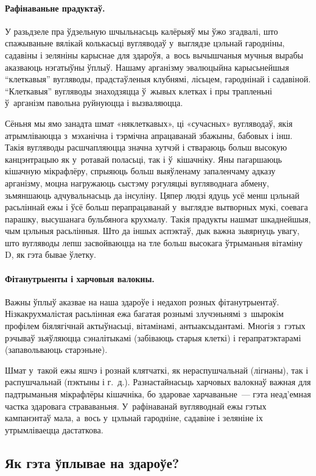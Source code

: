 \paragraph{Рафінаваньне прадуктаў.}
У разьдзеле пра ўдзельную шчыльнасьць калёрыяў мы ўжо згадвалі, што спажываньне вялікай колькасьці вугляводаў у~выглядзе цэльнай гародніны, садавіны і зеляніны карыснае для здароўя, а~вось вычышчаныя мучныя вырабы аказваюць нэгатыўны ўплыў. Нашаму арганізму эвалюцыйна карысьнейшыя ``клеткавыя'' вугляводы, прадстаўленыя клубнямі, лісьцем, гароднінай і садавіной. ``Клеткавыя'' вугляводы знаходзяцца ў~жывых клетках і пры трапленьні ў~арганізм павольна руйнуюцца і вызваляюцца.

Сёньня мы ямо занадта шмат «няклеткавых», ці «сучасных» вугляводаў, якія атрымліваюцца з~мэханічна і тэрмічна апрацаванай збажыны, бабовых і інш. Такія вугляводы расшчапляюцца значна хутчэй і ствараюць больш высокую канцэнтрацыю як у~ротавай поласьці, так і ў~кішачніку. Яны пагаршаюць кішачную мікрафлёру, спрыяюць больш выяўленаму запаленчаму адказу арганізму, моцна нагружаюць сыстэму рэгуляцыі вугляводнага абмену, зьмяншаюць адчувальнасьць да інсуліну. Цяпер людзі ядуць усё менш цэльнай расьліннай ежы і ўсё больш перапрацаванай у~выглядзе вытворных мукі, соевага парашку, высушанага бульбянога крухмалу. Такія прадукты нашмат шкаднейшыя, чым цэльныя расьлінныя. Што да іншых аспэктаў, дык важна зьвярнуць увагу, што вугляводы лепш засвойваюцца на тле больш высокага ўтрыманьня вітаміну D, як гэта бывае ўлетку.

\paragraph{Фітанутрыенты і харчовыя валокны.}
Важны ўплыў аказвае на наша здароўе і недахоп розных фітанутрыентаў. Нізкакрухмалістая расьлінная ежа багатая рознымі злучэньнямі з~шырокім профілем біялягічнай актыўнасьці, вітамінамі, антыаксыдантамі. Многія з~гэтых рэчываў зьяўляюцца сэналітыкамі (забіваюць старыя клеткі) і герапратэктарамі (запавольваюць старэньне).

Шмат у~такой ежы яшчэ і рознай клятчаткі, як нераспушчальнай (лігнаны), так і распушчальнай (пэктыны і г.~д.). Разнастайнасьць харчовых валокнаў важная для падтрыманьня мікрафлёры кішачніка, бо здаровае харчаваньне~--- гэта неад'емная частка здаровага страваваньня. У~рафінаванай вугляводнай ежы гэтых кампанэнтаў мала, а~вось у~цэльнай гародніне, садавіне і зеляніне іх утрымліваецца дастаткова.

\subsection{Як гэта ўплывае на здароўе?}

